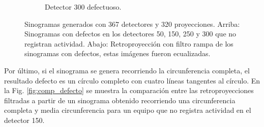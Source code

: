 \documentclass[letterpaper,12pt]{article}
\theoremstyle{plain}
\begin{document}
\begin{figure}[H]
\begin{subfigure}[h]{0.24\textwidth}
           \caption{Detector 300 defectuoso.}
           \label{fig:sinograma_300} 
        \end{subfigure}
   \caption{Sinogramas generados con 367 detectores y 320 proyecciones. Arriba: Sinogramas con defectos en los detectores 50, 150, 250 y 300 que no registran actividad. Abajo: Retroproyección con filtro rampa de los sinogramas con defectos, estas imágenes fueron ecualizadas.}
   \label{fig:detector_roto}
\end{figure}

Por último, si el sinograma se genera recorriendo la circunferencia completa, el resultado defecto es un círculo completo con cuatro líneas tangentes al círculo. En la Fig. \ref{fig:comp_defecto} se muestra la comparación entre las retroproyecciones filtradas a partir de un sinograma obtenido recorriendo una circunferencia completa y media circunferencia para un equipo que no registra actividad en el detector 150.
\end{document}
